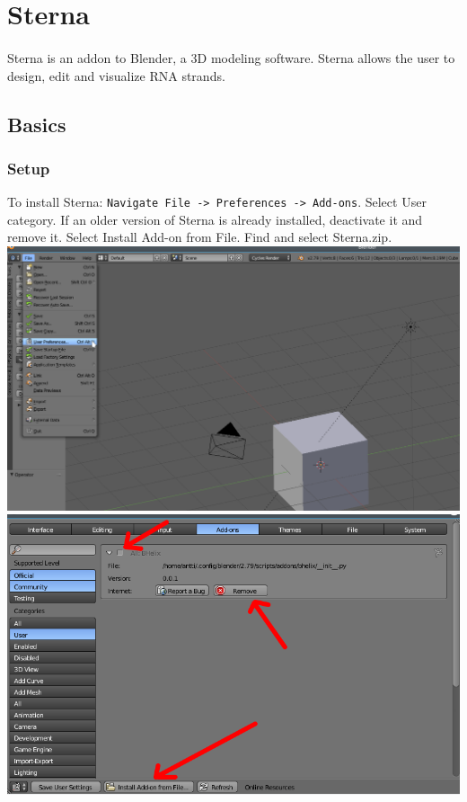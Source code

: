 \section{Sterna}
  \paragraph{}
    Sterna is an addon to Blender, a 3D modeling software. Sterna allows the user to design, edit and visualize RNA strands.
\subsection{Basics}
  \subsubsection{Setup}
    To install Sterna:
    \verb+Navigate File -> Preferences -> Add-ons+. Select User category.
    If an older version of Sterna is already installed, deactivate it and remove it.
    Select Install Add-on from File. Find and select Sterna.zip.
    \includegraphics[width=\textwidth]{images/Sterna_1}
    \includegraphics[width=\textwidth]{images/Sterna_2}
